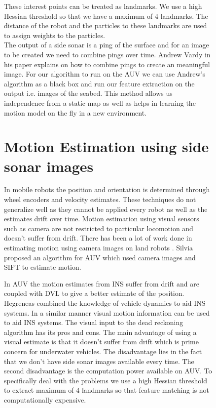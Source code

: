 \documentclass[12pt,draft]{dalcsthesis}
\begin{document}
{{\begin{figure}
{These interest points can be treated as landmarks. We use a high Hessian
threshold so that we have a maximum of 4 landmarks. The distance of the robot and the particles to these landmarks are used to assign weights to the particles.
\\
The output of a side sonar is a ping of the surface and for an image to be created we need to combine pings over time. Andrew Vardy in his paper explains on how to combine pings to create an meaningful image. For our algorithm to run on the AUV we can use Andrew's algorithm as a black box and run our feature extraction on the output i.e. images of the seabed. 
This method allows us independence from a static map as well as helps in learning
the motion model on the fly in a new environment. 

\section{Motion Estimation using side sonar images}

In mobile robots the position and orientation is determined through wheel encoders and velocity estimates. These techniques do not generalize well as they cannot be applied every robot as well as the estimates drift over time. Motion estimation using visual sensors such as camera are not restricted to particular locomotion and doesn't suffer from drift. There has been a lot of work done in estimating motion using camera images on land robots \cite{barfoot2005online} \cite{scaramuzza2008appearance}. Silvia \cite{Silva} proposed an algorithm for AUV which used camera images and SIFT to estimate motion. 

In AUV the motion estimates from INS suffer from drift and are coupled with DVL to give a better estimate of the position. Hegreneas \cite{hegrenaes2008model} combined the knowledge of vehicle dynamics to aid INS systems. In a similar manner visual motion information can be used to aid INS systems. The visual input to the dead reckoning algorithm has its pros and cons. The main advantage of using a visual estimate is that it doesn't suffer from drift which is prime concern for underwater vehicles. The disadvantage lies in the fact that we don't have side sonar images available every time. The second disadvantage is the computation power available on AUV. To specifically deal with the problems we use a high Hessian threshold to extract maximum of 4 landmarks so that feature matching is not computationally expensive.    

}
\end{figure}}}
\end{document}
